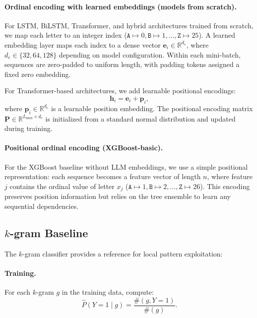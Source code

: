 \paragraph{Ordinal encoding with learned embeddings (models from scratch).}
For LSTM, BiLSTM, Transformer, and hybrid architectures trained from scratch, we map each letter to an integer index ($\texttt{A} \mapsto 0, \texttt{B} \mapsto 1, \ldots, \texttt{Z} \mapsto 25$). A learned embedding layer maps each index to a dense vector $\mathbf{e}_i \in \mathbb{R}^{d_e}$, where $d_e \in \{32, 64, 128\}$ depending on model configuration. Within each mini-batch, sequences are zero-padded to uniform length, with padding tokens assigned a fixed zero embedding.

For Transformer-based architectures, we add learnable positional encodings:
\begin{equation}
\mathbf{h}_i = \mathbf{e}_i + \mathbf{p}_i,
\end{equation}
where $\mathbf{p}_i \in \mathbb{R}^{d_e}$ is a learnable position embedding. The positional encoding matrix $\mathbf{P} \in \mathbb{R}^{L_{\max} \times d_e}$ is initialized from a standard normal distribution and updated during training.

\paragraph{Positional ordinal encoding (XGBoost-basic).}
For the XGBoost baseline without LLM embeddings, we use a simple positional representation: each sequence becomes a feature vector of length $n$, where feature $j$ contains the ordinal value of letter $x_j$ ($\texttt{A} \mapsto 1, \texttt{B} \mapsto 2, \ldots, \texttt{Z} \mapsto 26$). This encoding preserves position information but relies on the tree ensemble to learn any sequential dependencies.

\subsection{$k$-gram Baseline}
\label{subsec:kgram}

The $k$-gram classifier provides a reference for local pattern exploitation:

\paragraph{Training.} For each $k$-gram $g$ in the training data, compute:
\begin{equation}
\hat{P}(Y=1 \mid g) = \frac{\#(g, Y=1)}{\#(g)}.
\end{equation}

